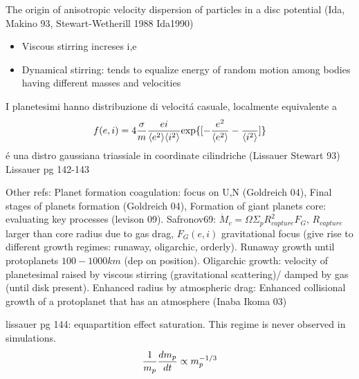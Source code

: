\begin{workout}
	The origin of anisotropic velocity dispersion of particles in a disc potential (Ida, Makino 93, Stewart-Wetherill 1988 Ida1990)
\end{workout}
\begin{workout}
	\begin{itemize}
		\item Viscous stirring increses i,e
		\item Dynamical stirring: tends to equalize energy of random motion among bodies having different masses and velocities
	\end{itemize}
\end{workout}
\begin{workout}
	I planetesimi hanno distribuzione di velocit\'a casuale, localmente equivalente a
	\begin{equation}
	f(e,i)=4\frac{\sigma}{m}\frac{ei}{\exv{e^2}\exv{i^2}}\Exp{[-\frac{e^2}{\exv{e^2}}-\frac{}{\exv{i^2}}]}
	\end{equation}
	\'e una distro gaussiana triassiale in coordinate cilindriche (Lissauer Stewart 93)
	Lissauer pg 142-143
\end{workout}
\begin{workout}
	Other refs: Planet formation coagulation: focus on U,N (Goldreich 04), Final stages of planets formation (Goldreich 04), Formation of giant planets core: evaluating key processes (levison 09).
	Safronov69: $\dot{M}_c=\Omega\Sigma_pR^2_{capture}F_G$, $R_{capture}$ larger than core radius due to gas drag, $F_G(e,i)$ gravitational focus (give rise to different growth regimes: runaway, oligarchic, orderly).
	Runaway growth until protoplanets $100-1000km$ (dep on position).
	Oligarchic growth: velocity of planetesimal raised by viscous stirring (gravitational scattering)/ damped by gas (until disk present).
	Enhanced radius by atmospheric drag: Enhanced collisional growth of a protoplanet that has an atmosphere (Inaba Ikoma 03)
\end{workout}
\begin{workout}
	lissauer pg 144: equapartition effect saturation. This regime is never observed in simulations.
	\begin{equation}
	\frac{1}{m_p}\TDy{t}{m_p}\propto m_p\expy{-1/3}
	\end{equation}
\end{workout}

